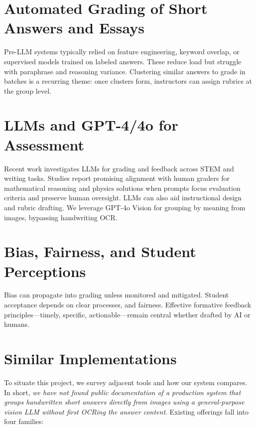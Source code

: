 \documentclass[ms,twoside,print]{nuthesis}
\begin{document}
\section{Automated Grading of Short Answers and Essays}
Pre-LLM systems typically relied on feature engineering, keyword overlap, or supervised models trained on labeled answers. These reduce load but struggle with paraphrase and reasoning variance\cite{Weegar2022,Konnecke2020}. Clustering similar answers to grade in batches is a recurring theme: once clusters form, instructors can assign rubrics at the group level.

\section{LLMs and GPT-4/4o for Assessment}
Recent work investigates LLMs for grading and feedback across STEM and writing tasks. Studies report promising alignment with human graders for mathematical reasoning and physics solutions when prompts focus evaluation criteria and preserve human oversight\cite{Liu2023,Kortemeyer2023,Kortemeyer2023b}. LLMs can also aid instructional design and rubric drafting\cite{Lund2023}. We leverage GPT-4o Vision for grouping by meaning from images, bypassing handwriting OCR.

\section{Bias, Fairness, and Student Perceptions}
Bias can propagate into grading unless monitored and mitigated\cite{Mehrabi2021}. Student acceptance depends on clear processes, and fairness\cite{Tossell2023}. Effective formative feedback principles—timely, specific, actionable—remain central whether drafted by AI or humans\cite{Nicol2006}.

\section{Similar Implementations}
To situate this project, we survey adjacent tools and how our system compares. In short,
\emph{we have not found public documentation of a production system that groups handwritten
short answers directly from images using a general-purpose vision LLM without first OCRing the
answer content}. Existing offerings fall into four families:
\end{document}
